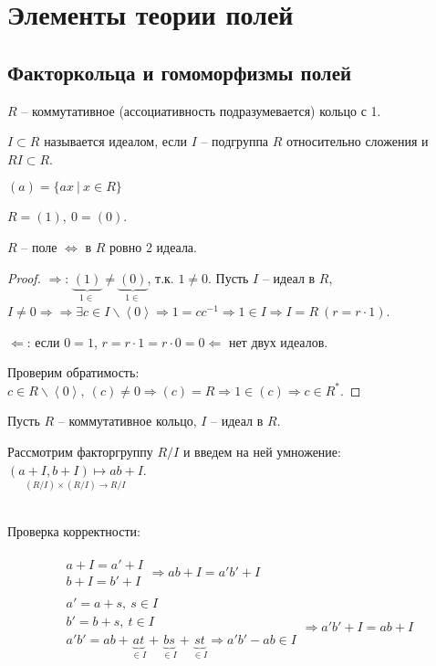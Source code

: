 \documentclass[main]{subfiles}
\begin{document}
\part{Элементы теории полей}

\chapter{Факторкольца и гомоморфизмы полей}

$R$ -- коммутативное (ассоциативность подразумевается) кольцо с 1. 

$I \subset R$ называется идеалом, если $I$ -- подгруппа $R$ относительно сложения и $RI \subset R$.

$(a) = \{ax \ |\ x \in R\}$

$R = (1), \ 0 = (0)$.

\begin{proposition}
    $R$ -- поле $\Leftrightarrow$ в $R$ ровно 2 идеала.
\end{proposition}

\begin{proof}
    $\Rightarrow$: $\underbrace{(1)}_{1 \in} \neq \underbrace{(0)}_{1 \in}$, т.к. $1 \neq 0$.
    Пусть $I$ -- идеал в $R$, $I \neq 0 \Rightarrow \Rightarrow \exists c \in I \backslash \left\langle 0\right\rangle
    \Rightarrow 1 = c c^{-1} \Rightarrow 1 \in I \Rightarrow I = R \ (r = r \cdot 1) $.

    $\Leftarrow$: если $0 = 1$, $r = r \cdot 1 = r \cdot 0 = 0 \Leftarrow$ нет двух идеалов.
    
    Проверим обратимость: $c \in R \backslash \left\langle 0\right\rangle, \ (c) \neq 0 \Rightarrow
    (c) = R \Rightarrow 1 \in (c) \Rightarrow c \in R^*$. 
\end{proof}

Пусть $R$ -- коммутативное кольцо, $I$ -- идеал в $R$.

Рассмотрим факторгруппу $R/I$ и введем на ней умножение: \\ $\underset{(R/I)\times(R/I) \rightarrow R/I}{(a+I, b+I) \mapsto ab+I}$.

\\

Проверка корректности:

\begin{gather*}
    \begin{gathered}
        a + I = a' + I \\
        b + I = b' + I 
    \end{gathered} \Rightarrow ab +I = a'b' +I \\
    \begin{gathered}
        a'= a + s, \ s\in I \\
        b'= b + s, \ t\in I \\
        a'b' = ab + \underbrace{at}_{\in I} + \underbrace{bs}_{\in I} + \underbrace{st}_{\in I}  \Rightarrow a'b' - ab \in I
    \end{gathered} \Rightarrow a'b' + I = ab +I
\end{gather*}
\end{document}
